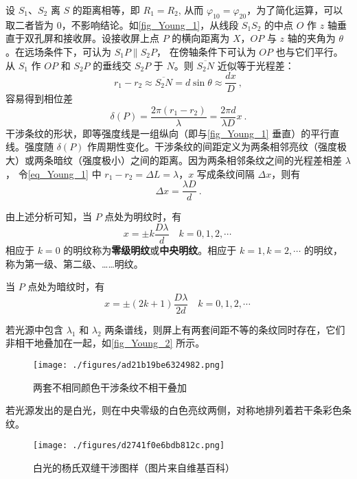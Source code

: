设 $S_1$、$S_2$ 离 $S$ 的距离相等，即 $R_1=R_2$, 从而 $\varphi_{10}=\varphi_{20}$，为了简化运算，可以取二者皆为 $0$，不影响结论。如\autoref{fig_Young_1}，从线段 $S_1S_2$ 的中点 $O$ 作 $z$ 轴垂直于双孔屏和接收屏。设接收屏上点 $P$ 的横向距离为 $X$，$OP$ 与 $z$ 轴的夹角为 $\theta$。在远场条件下，可认为 $S_1P\parallel S_2P$， 在傍轴条件下可认为 $OP$ 也与它们平行。从 $S_1$ 作 $OP$ 和 $S_2P$ 的垂线交 $S_2P$ 于 $N$。则 $\overline{S_2N}$ 近似等于光程差：
\begin{equation} \label{eq_Young_1}
r_{1}-r_{2} \approx \overline{S_{2} N}=d \sin \theta \approx \frac{d x}{D}~,
\end{equation}
容易得到相位差
\begin{equation}
\delta(P)=\frac{2 \pi\left(r_{1}-r_{2}\right)}{\lambda}=\frac{2 \pi d}{\lambda D} x~.
\end{equation}
干涉条纹的形状，即等强度线是一组纵向（即与\autoref{fig_Young_1} 垂直）的平行直线。强度随 $\delta(P)$ 作周期性变化。干涉条纹的间距定义为两条相邻亮纹（强度极大）或两条暗纹（强度极小）之间的距离。因为两条相邻条纹之间的光程差相差 $\lambda$， 令\autoref{eq_Young_1} 中 $r_1-r_2=\Delta L=\lambda$，$ x $ 写成条纹间隔 $\Delta x$，则有
\begin{equation}
\Delta x=\frac{\lambda D}{d}~.
\end{equation}

由上述分析可知，当 $P$ 点处为明纹时，有
\begin{equation}
x=\pm k \frac{D \lambda}{d} \quad k=0,1,2, \cdots~
\end{equation}
相应于 $k=0$ 的明纹称为\textbf{零级明纹}或\textbf{中央明纹}。相应于 $k=1, k=2, \cdots$ 的明纹，称为第一级、第二级、……明纹。

当 $P$ 点处为暗纹时，有
\begin{equation}
x=\pm(2 k+1) \frac{D \lambda}{2 d} \quad k=0,1,2, \cdots~
\end{equation}

若光源中包含 $\lambda_1$ 和 $\lambda_2$ 两条谱线，则屏上有两套间距不等的条纹同时存在，它们非相干地叠加在一起，如\autoref{fig_Young_2} 所示。
\begin{figure}[ht]
\centering
\texttt{[image: ./figures/ad21b19be6324982.png]}
\caption{两套不相同颜色干涉条纹不相干叠加} \label{fig_Young_2}
\end{figure}
若光源发出的是白光，则在中央零级的白色亮纹两侧，对称地排列着若干条彩色条纹。
\begin{figure}[ht]
\centering
\texttt{[image: ./figures/d2741f0e6bdb812c.png]}
\caption{白光的杨氏双缝干涉图样（图片来自维基百科）} \label{fig_Young_3}
\end{figure}
